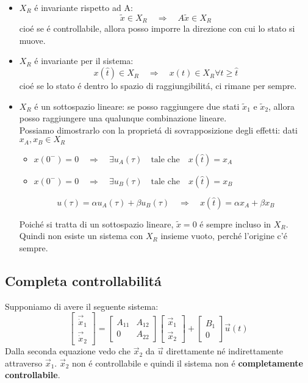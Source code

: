 \documentclass[../main.tex]{subfiles}
\begin{document}
		\begin{itemize}
			\item
				$ X_R $ \'e invariante rispetto ad A:
				\[
					\tilde x \in X_R \quad\Rightarrow\quad A \tilde x \in X_R
				\]
				cio\'e se \'e controllabile, allora posso imporre la direzione con cui lo stato si muove.
			\item
				$ X_R $ \'e invariante per il sistema:
				\[
					x(\hat t) \in X_R \quad\Rightarrow\quad x(t) \in X_R \forall t \geq \hat t
				\]
				cio\'e se lo stato \'e dentro lo spazio di raggiungibilit\'a, ci rimane per sempre.
			\item
				$ X_R $ \'e un sottospazio lineare: se posso raggiungere due stati $ \tilde x_1 $ e $ \tilde x_2 $, allora posso raggiungere una qualunque combinazione lineare.\\
				Possiamo dimostrarlo con la propriet\'a di sovrapposizione degli effetti:
				dati $ x_A, x_B \in X_R $
				\begin{itemize}
					\item 
						$ x(0^-) = 0 \quad\Rightarrow\quad \exists u_A(\tau) \quad\text{tale che}\quad x(\hat t) = x_A $
					\item
						$ x(0^-) = 0 \quad\Rightarrow\quad \exists u_B(\tau) \quad\text{tale che}\quad x(\hat t) = x_B $
				\end{itemize}
				\[ 
					u(\tau) = \alpha u_A(\tau) + \beta u_B(\tau) \quad\Rightarrow\quad x(\hat t) = \alpha x_A + \beta x_B
				\]
				
				Poich\'e si tratta di un sottospazio lineare, $ \tilde x = 0 $ \'e sempre incluso in $ X_R $. Quindi non esiste un sistema con $ X_R $ insieme vuoto, perch\'e l'origine c'\'e sempre.
		\end{itemize}
		
	\subsection{Completa controllabilit\'a}
		Supponiamo di avere il seguente sistema:
		\[
			\begin{bmatrix}
				\vec{\dot x}_1 \\ \vec{\dot x}_2
			\end{bmatrix} = 
			\begin{bmatrix}
				A_{11} & A_{12}\\
				0 & A_{22}
			\end{bmatrix}
			\begin{bmatrix}
				\vec x_1 \\ \vec x_2
			\end{bmatrix} +
			\begin{bmatrix}
				B_1 \\ 0
			\end{bmatrix} \vec u(t)
		\]
		Dalla seconda equazione vedo che $ \vec x_2 $ da $ \vec u $ direttamente n\'e indirettamente attraverso $ \vec x_1 $. $ \vec x_2 $ non \'e controllabile e quindi il sistema non \'e \textbf{completamente controllabile}.
	
\end{document}
